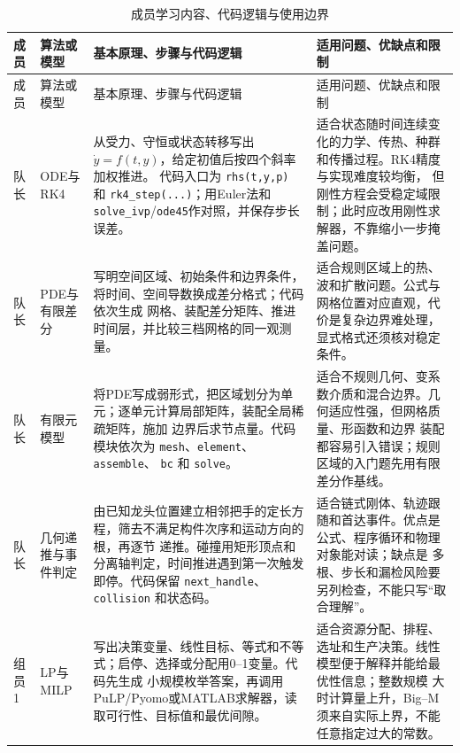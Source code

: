 \documentclass[UTF8,zihao=-4]{ctexart}
\begin{document}
\setlength{\tabcolsep}{2.5pt}
\small
\begin{longtable}{p{1.25cm}p{2.55cm}p{6.25cm}p{5.45cm}}
\caption{成员学习内容、代码逻辑与使用边界}\label{tab:learning-units}\\
\toprule
成员 & 算法或模型 & 基本原理、步骤与代码逻辑 & 适用问题、优缺点和限制\\
\midrule
\endfirsthead
\toprule
成员 & 算法或模型 & 基本原理、步骤与代码逻辑 & 适用问题、优缺点和限制\\
\midrule
\endhead
\bottomrule
\endfoot

队长 & ODE与RK4
& 从受力、守恒或状态转移写出 $\dot{y}=f(t,y)$，给定初值后按四个斜率加权推进。
代码入口为 \texttt{rhs(t,y,p)} 和 \texttt{rk4\_step(...)}；用Euler法和
\texttt{solve\_ivp}/\texttt{ode45}作对照，并保存步长误差。
& 适合状态随时间连续变化的力学、传热、种群和传播过程。RK4精度与实现难度较均衡，
但刚性方程会受稳定域限制；此时应改用刚性求解器，不靠缩小一步掩盖问题。\\

队长 & PDE与有限差分
& 写明空间区域、初始条件和边界条件，将时间、空间导数换成差分格式；代码依次生成
网格、装配差分矩阵、推进时间层，并比较三档网格的同一观测量。
& 适合规则区域上的热、波和扩散问题。公式与网格位置对应直观，代价是复杂边界难处理，
显式格式还须核对稳定条件。\\

队长 & 有限元模型
& 将PDE写成弱形式，把区域划分为单元；逐单元计算局部矩阵，装配全局稀疏矩阵，施加
边界后求节点量。代码模块依次为 \texttt{mesh}、\texttt{element}、\texttt{assemble}、
\texttt{bc} 和 \texttt{solve}。
& 适合不规则几何、变系数介质和混合边界。几何适应性强，但网格质量、形函数和边界
装配都容易引入错误；规则区域的入门题先用有限差分作基线。\\

队长 & 几何递推与事件判定
& 由已知龙头位置建立相邻把手的定长方程，筛去不满足构件次序和运动方向的根，再逐节
递推。碰撞用矩形顶点和分离轴判定，时间推进遇到第一次触发即停。代码保留
\texttt{next\_handle}、\texttt{collision} 和状态码。
& 适合链式刚体、轨迹跟随和首达事件。优点是公式、程序循环和物理对象能对读；缺点是
多根、步长和漏检风险要另列检查，不能只写“取合理解”。\\

组员1 & LP与MILP
& 写出决策变量、线性目标、等式和不等式；启停、选择或分配用0--1变量。代码先生成
小规模枚举答案，再调用PuLP/Pyomo或MATLAB求解器，读取可行性、目标值和最优间隙。
& 适合资源分配、排程、选址和生产决策。线性模型便于解释并能给最优性信息；整数规模
大时计算量上升，Big--M须来自实际上界，不能任意指定过大的常数。\\


\end{longtable}
\end{document}
